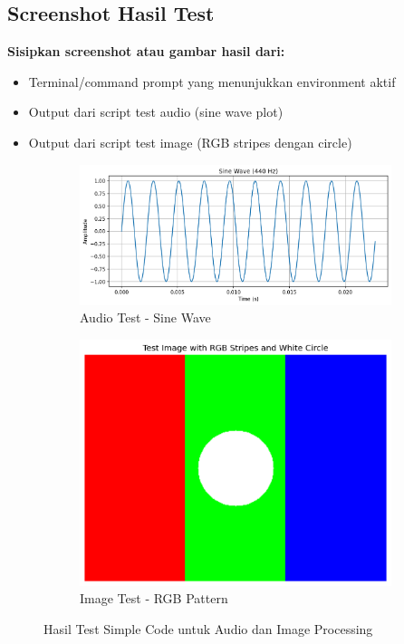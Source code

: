 \documentclass[11pt,a4paper]{article}
\begin{document}
\subsection{Screenshot Hasil Test}
\textbf{Sisipkan screenshot atau gambar hasil dari:}
\begin{itemize}
    \item Terminal/command prompt yang menunjukkan environment aktif
    \item Output dari script test audio (sine wave plot)
    \item Output dari script test image (RGB stripes dengan circle)
\end{itemize}

\begin{figure}[h!]
\centering
\begin{subfigure}[b]{0.48\textwidth}
    \centering
    \includegraphics[width=\textwidth]{sine_wave_test.png}
    \caption{Audio Test - Sine Wave}
    \label{fig:sinewave}
\end{subfigure}
\hfill
\begin{subfigure}[b]{0.48\textwidth}
    \centering
    \includegraphics[width=\textwidth]{test_image.png}
    \caption{Image Test - RGB Pattern}
    \label{fig:testimage}
\end{subfigure}
\caption{Hasil Test Simple Code untuk Audio dan Image Processing}
\label{fig:test-results}
\end{figure}
\end{document}
